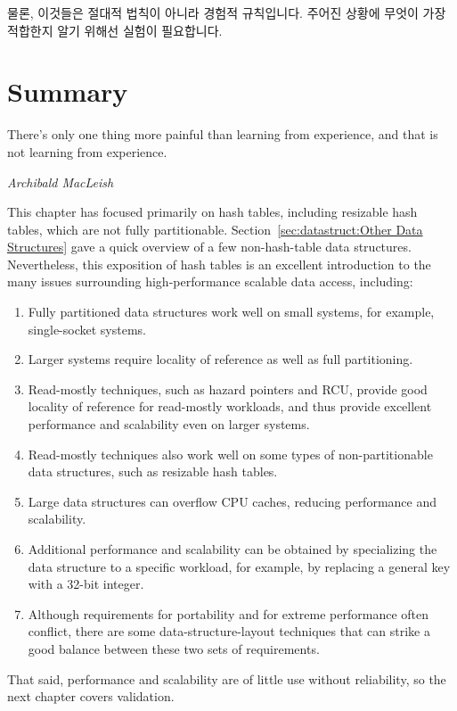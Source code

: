 물론, 이것들은 절대적 법칙이 아니라 경험적 규칙입니다.
주어진 상황에 무엇이 가장 적합한지 알기 위해선 실험이 필요합니다.

\section{Summary}
\label{sec:datastruct:Summary}
%
\epigraph{There's only one thing more painful than learning from
	  experience, and that is not learning from experience.}
	 {\emph{Archibald MacLeish}}

This chapter has focused primarily on hash tables, including resizable
hash tables, which are not fully partitionable.
Section~\ref{sec:datastruct:Other Data Structures} gave a quick
overview of a few non-hash-table data structures.
Nevertheless, this exposition of hash tables is an excellent introduction
to the many issues surrounding high-performance scalable data access,
including:

\begin{enumerate}
\item	Fully partitioned data structures work well on small systems,
	for example, single-socket systems.
\item	Larger systems require locality of reference as well as
	full partitioning.
\item	Read-mostly techniques, such as hazard pointers and RCU,
	provide good locality of reference for read-mostly workloads,
	and thus provide excellent performance and scalability even
	on larger systems.
\item	Read-mostly techniques also work well on some types of
	non-partitionable data structures, such as resizable hash tables.
\item	Large data structures can overflow CPU caches, reducing performance
	and scalability.
\item	Additional performance and scalability can be obtained by
	specializing the data structure to a specific workload,
	for example, by replacing a general key with a 32-bit integer.
\item	Although requirements for portability and for extreme performance
	often conflict, there are some data-structure-layout techniques
	that can strike a good balance between these two sets of
	requirements.
\end{enumerate}

That said, performance and scalability are of little use without reliability,
so the next chapter covers validation.

